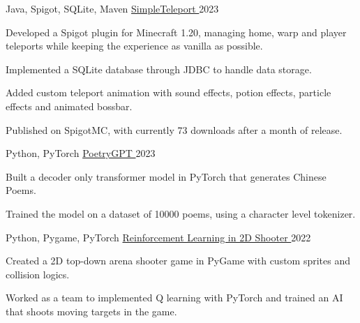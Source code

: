 

\begin{cventries}

  \cventry
    {Java, Spigot, SQLite, Maven} %
    {\href{https://github.com/shiqui/simple-teleport}{SimpleTeleport {\faLink}}} %
    {} %
    {2023} %
    {
      \begin{cvitems} %
        \item {Developed a Spigot plugin for Minecraft 1.20, managing home, warp and player teleports while keeping the experience as vanilla as possible.}
        \item {Implemented a SQLite database through JDBC to handle data storage.}
        \item {Added custom teleport animation with sound effects, potion effects, particle effects and animated bossbar.}
        \item {Published on SpigotMC, with currently 73 downloads after a month of release.}
      \end{cvitems}
    }

  \cventry
  {Python, PyTorch} %
  {\href{https://github.com/shiqui/PoetryGPT}{PoetryGPT {\faLink}}} %
  {} %
  {2023} %
  {
    \begin{cvitems} %
      \item {Built a decoder only transformer model in PyTorch that generates Chinese Poems.}
      \item {Trained the model on a dataset of 10000 poems, using a character level tokenizer.}
    \end{cvitems}
  }

  \cventry
    {Python, Pygame, PyTorch} %
    {\href{https://github.com/shiqui/TSDP-Reinforcement-Learning-in-Video-Games}{Reinforcement Learning in 2D Shooter {\faLink}}} %
    {} %
    {2022} %
    {
      \begin{cvitems} %
        \item {Created a 2D top-down arena shooter game in PyGame with custom sprites and collision logics.}
        \item {Worked as a team to implemented Q learning with PyTorch and trained an AI that shoots moving targets in the game.}
      \end{cvitems}
    }


\end{cventries}

